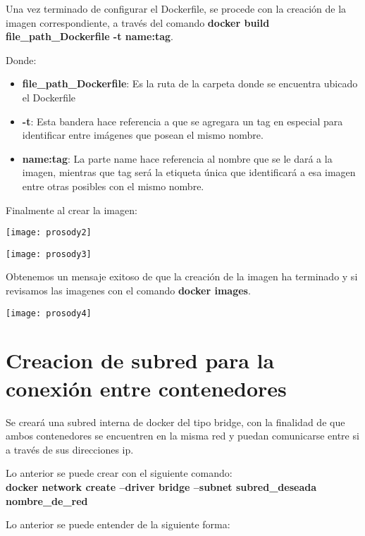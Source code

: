 \documentclass[10pt,letterpaper]{article}
\begin{document}
Una vez terminado de configurar el Dockerfile, se procede con la creación de la imagen correspondiente, a través del comando \textbf{docker build file\_path\_Dockerfile -t name:tag}.

Donde:

\begin{itemize}
\item \textbf{file\_path\_Dockerfile}: Es la ruta de la carpeta donde se encuentra ubicado el Dockerfile
\item \textbf{-t}: Esta bandera hace referencia a que se agregara un tag en especial para identificar entre imágenes que posean el mismo nombre.
\item \textbf{name:tag}: La parte name hace referencia al nombre que se le dará a la imagen, mientras que tag será la etiqueta única que identificará a esa imagen entre otras posibles con el mismo nombre.
\end{itemize}

Finalmente al crear la imagen:

\begin{center}
\texttt{[image: prosody2]}
\end{center}

\begin{center}
\texttt{[image: prosody3]}
\end{center}

Obtenemos un mensaje exitoso de que la creación de la imagen ha terminado y si revisamos las imagenes con el comando \textbf{docker images}.

\begin{center}
\texttt{[image: prosody4]}
\end{center}

\section{Creacion de subred para la conexión entre contenedores}
Se creará una subred interna de docker del tipo bridge, con la finalidad de que ambos contenedores se encuentren en la misma red y puedan comunicarse entre si a través de sus direcciones ip.

Lo anterior se puede crear con el siguiente comando:\\

\textbf{docker network create --driver bridge --subnet subred\_deseada nombre\_de\_red}

Lo anterior se puede entender de la siguiente forma:
\end{document}

